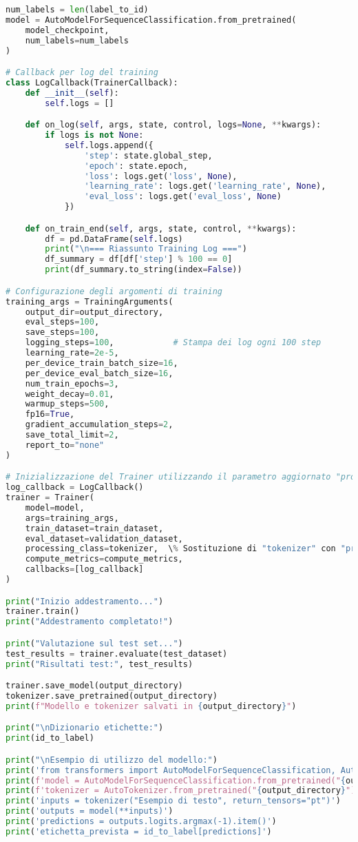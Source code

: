 \documentclass[a4paper,12pt]{article}
\begin{document}
\begin{lstlisting}[language=Python, caption={Versione Finale --- Codice Completo}]
num_labels = len(label_to_id)
model = AutoModelForSequenceClassification.from_pretrained(
    model_checkpoint,
    num_labels=num_labels
)

# Callback per log del training
class LogCallback(TrainerCallback):
    def __init__(self):
        self.logs = []

    def on_log(self, args, state, control, logs=None, **kwargs):
        if logs is not None:
            self.logs.append({
                'step': state.global_step,
                'epoch': state.epoch,
                'loss': logs.get('loss', None),
                'learning_rate': logs.get('learning_rate', None),
                'eval_loss': logs.get('eval_loss', None)
            })

    def on_train_end(self, args, state, control, **kwargs):
        df = pd.DataFrame(self.logs)
        print("\n=== Riassunto Training Log ===")
        df_summary = df[df['step'] % 100 == 0]
        print(df_summary.to_string(index=False))

# Configurazione degli argomenti di training
training_args = TrainingArguments(
    output_dir=output_directory,
    eval_steps=100,
    save_steps=100,
    logging_steps=100,            # Stampa dei log ogni 100 step
    learning_rate=2e-5,
    per_device_train_batch_size=16,
    per_device_eval_batch_size=16,
    num_train_epochs=3,
    weight_decay=0.01,
    warmup_steps=500,
    fp16=True,
    gradient_accumulation_steps=2,
    save_total_limit=2,
    report_to="none"
)

# Inizializzazione del Trainer utilizzando il parametro aggiornato "processing_class"
log_callback = LogCallback()
trainer = Trainer(
    model=model,
    args=training_args,
    train_dataset=train_dataset,
    eval_dataset=validation_dataset,
    processing_class=tokenizer,  \% Sostituzione di "tokenizer" con "processing_class"
    compute_metrics=compute_metrics,
    callbacks=[log_callback]
)

print("Inizio addestramento...")
trainer.train()
print("Addestramento completato!")

print("Valutazione sul test set...")
test_results = trainer.evaluate(test_dataset)
print("Risultati test:", test_results)

trainer.save_model(output_directory)
tokenizer.save_pretrained(output_directory)
print(f"Modello e tokenizer salvati in {output_directory}")

print("\nDizionario etichette:")
print(id_to_label)

print("\nEsempio di utilizzo del modello:")
print('from transformers import AutoModelForSequenceClassification, AutoTokenizer')
print(f'model = AutoModelForSequenceClassification.from_pretrained("{output_directory}")')
print(f'tokenizer = AutoTokenizer.from_pretrained("{output_directory}")')
print('inputs = tokenizer("Esempio di testo", return_tensors="pt")')
print('outputs = model(**inputs)')
print('predictions = outputs.logits.argmax(-1).item()')
print('etichetta_prevista = id_to_label[predictions]')


\end{lstlisting}
\end{document}

